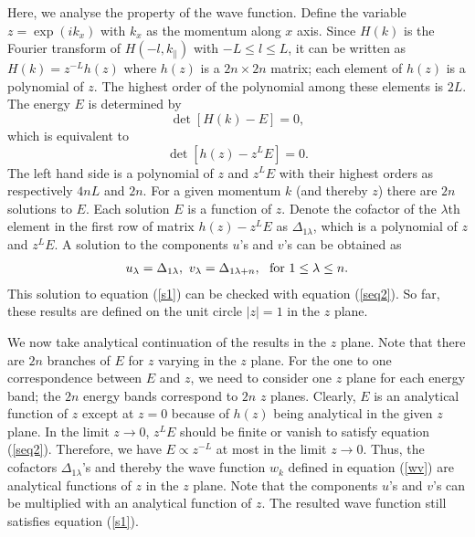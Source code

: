 \documentclass[aps,pra,amsmath,twocolumn,showpacs,bibnotes,10pt]{revtex4-1}
\begin{document}
Here, we analyse the property of the wave function. Define the variable $z = \exp(ik_x)$
with $k_x$ as the momentum along $x$ axis. Since $H(k)$ is the Fourier transform of $H(-l,k_{\parallel})$ with $-L \le l \le L$, it can be written as $H(k) = z^{-L}h(z)$ where $h(z)$ is a $2n\times 2n$ matrix; each element of $h(z)$ is a polynomial of $z$. The highest order of the polynomial among these elements is $2L$. The energy $E$ is determined by
\begin{equation}
\det [H(k) - E] = 0,             \nonumber
\end{equation}
which is equivalent to 
\begin{equation}
\det [h(z) - z^{L}E] = 0. \label{seq2}
\end{equation}
The left hand side is a polynomial of $z$ and $z^LE$ with their highest orders as respectively $4nL$ and $2n$. For a given momentum $k$ (and thereby $z$) there are $2n$ solutions to $E$. Each solution $E$ is a function of $z$. Denote the cofactor of the $\lambda$th element in the first row of matrix $h(z)-z^LE$ as $\Delta_{1\lambda}$, which is a polynomial of $z$ and $z^LE$. A solution to the components $u$'s and $v$'s can be obtained as 
\begin{eqnarray}
u_{\lambda} = \Delta_{1\lambda}, ~
v_{\lambda} = \Delta_{1\lambda+n}, ~~ {\rm for}~ 1 \le \lambda \le n. \nonumber
\end{eqnarray}
This solution to equation (\ref{s1}) can be checked with equation (\ref{seq2}). So far, these results are defined on the unit circle $|z| = 1$ in the $z$ plane. 

We now take analytical continuation of the results in the $z$ plane. Note that there are $2n$ branches of $E$ for $z$ varying in the $z$ plane. For the one to one correspondence between $E$ and $z$, we need to consider one $z$ plane for each energy band; the $2n$ energy bands correspond to $2n$ $z$ planes. Clearly, $E$ is an analytical function of $z$ except at $z=0$ because of $h(z)$ being analytical in the given $z$ plane. In the limit $z \to 0$, $z^{L}E$ should be finite or vanish to satisfy equation (\ref{seq2}). Therefore, we have $E \propto z^{-L}$ at most in the limit $z \to 0$. Thus, the cofactors $\Delta_{1\lambda}$'s and thereby the wave function $w_k$ defined in equation (\ref{wv}) are analytical functions of $z$ in the $z$ plane.  Note that the components $u$'s and $v$'s can be multiplied with an analytical function of $z$. The resulted wave function still satisfies equation (\ref{s1}).
\end{document}
